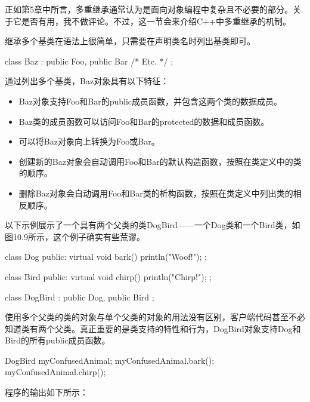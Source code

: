 
正如第5章中所言，多重继承通常认为是面向对象编程中复杂且不必要的部分。关于它是否有用，我不做评论。不过，这一节会来介绍C++中多重继承的机制。


继承多个基类在语法上很简单，只需要在声明类名时列出基类即可。

\begin{cpp}
class Baz : public Foo, public Bar { /* Etc. */ };
\end{cpp}

通过列出多个基类，Baz对象具有以下特征：

\begin{itemize}
\item
Baz对象支持Foo和Bar的public成员函数，并包含这两个类的数据成员。

\item
Baz类的成员函数可以访问Foo和Bar的protected的数据和成员函数。

\item
可以将Baz对象向上转换为Foo或Bar。

\item
创建新的Baz对象会自动调用Foo和Bar的默认构造函数，按照在类定义中的类的顺序。

\item
删除Baz对象会自动调用Foo和Bar类的析构函数，按照在类定义中列出类的相反顺序。
\end{itemize}

以下示例展示了一个具有两个父类的类DogBird——一个Dog类和一个Bird类，如图10.9所示，这个例子确实有些荒谬。


\begin{cpp}
class Dog
{
    public:
        virtual void bark() { println("Woof!"); }
};

class Bird
{
    public:
        virtual void chirp() { println("Chirp!"); }
};

class DogBird : public Dog, public Bird
{
};
\end{cpp}

使用多个父类的类的对象与单个父类的对象的用法没有区别，客户端代码甚至不必知道类有两个父类。真正重要的是类支持的特性和行为，DogBird对象支持Dog和Bird的所有public成员函数。

\begin{cpp}
DogBird myConfusedAnimal;
myConfusedAnimal.bark();
myConfusedAnimal.chirp();
\end{cpp}

程序的输出如下所示：

